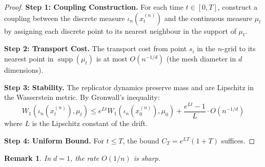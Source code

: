 \documentclass[12pt]{article}
\newtheorem{remark}{Remark}[section]
\DeclareMathOperator{\supp}{supp}
\begin{document}
\begin{proof}
\textbf{Step 1: Coupling Construction.}
For each time $t \in [0, T]$, construct a coupling between the discrete measure $\iota_n(x_t^{(n)})$ and the continuous measure $\mu_t$ by assigning each discrete point to its nearest neighbour in the support of $\mu_t$.

\textbf{Step 2: Transport Cost.}
The transport cost from point $s_i$ in the $n$-grid to its nearest point in $\supp(\mu_t)$ is at most $O(n^{-1/d})$ (the mesh diameter in $d$ dimensions).

\textbf{Step 3: Stability.}
The replicator dynamics preserve mass and are Lipschitz in the Wasserstein metric. By Gronwall's inequality:
\[
W_1(\iota_n(x_t^{(n)}), \mu_t) \leq e^{Lt} W_1(\iota_n(x_0^{(n)}), \mu_0) + \frac{e^{Lt} - 1}{L} \cdot O(n^{-1/d})
\]
where $L$ is the Lipschitz constant of the drift.

\textbf{Step 4: Uniform Bound.}
For $t \leq T$, the bound $C_T = e^{LT}(1 + T)$ suffices.
\end{proof}

\begin{remark}
In $d = 1$, the rate $O(1/n)$ is sharp.
\end{remark}
\end{document}

